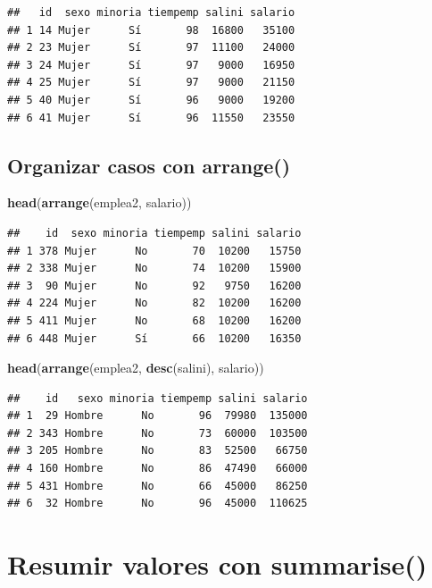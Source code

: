 \documentclass[]{book}
\newenvironment{Shaded}{\begin{snugshade}}{\end{snugshade}}
\newcommand{\KeywordTok}[1]{\textcolor[rgb]{0.13,0.29,0.53}{\textbf{#1}}}
\newcommand{\NormalTok}[1]{#1}
\begin{document}
\begin{verbatim}
##   id  sexo minoria tiempemp salini salario
## 1 14 Mujer      Sí       98  16800   35100
## 2 23 Mujer      Sí       97  11100   24000
## 3 24 Mujer      Sí       97   9000   16950
## 4 25 Mujer      Sí       97   9000   21150
## 5 40 Mujer      Sí       96   9000   19200
## 6 41 Mujer      Sí       96  11550   23550
\end{verbatim}

\subsection{\texorpdfstring{Organizar casos con
\textbf{arrange()}}{Organizar casos con arrange()}}\label{organizar-casos-con-arrange}

\begin{Shaded}
\begin{Highlighting}[]
\KeywordTok{head}\NormalTok{(}\KeywordTok{arrange}\NormalTok{(emplea2, salario))}
\end{Highlighting}
\end{Shaded}

\begin{verbatim}
##    id  sexo minoria tiempemp salini salario
## 1 378 Mujer      No       70  10200   15750
## 2 338 Mujer      No       74  10200   15900
## 3  90 Mujer      No       92   9750   16200
## 4 224 Mujer      No       82  10200   16200
## 5 411 Mujer      No       68  10200   16200
## 6 448 Mujer      Sí       66  10200   16350
\end{verbatim}

\begin{Shaded}
\begin{Highlighting}[]
\KeywordTok{head}\NormalTok{(}\KeywordTok{arrange}\NormalTok{(emplea2, }\KeywordTok{desc}\NormalTok{(salini), salario))}
\end{Highlighting}
\end{Shaded}

\begin{verbatim}
##    id   sexo minoria tiempemp salini salario
## 1  29 Hombre      No       96  79980  135000
## 2 343 Hombre      No       73  60000  103500
## 3 205 Hombre      No       83  52500   66750
## 4 160 Hombre      No       86  47490   66000
## 5 431 Hombre      No       66  45000   86250
## 6  32 Hombre      No       96  45000  110625
\end{verbatim}

\section{\texorpdfstring{Resumir valores con
\textbf{summarise()}}{Resumir valores con summarise()}}\label{resumir-valores-con-summarise}
\end{document}
